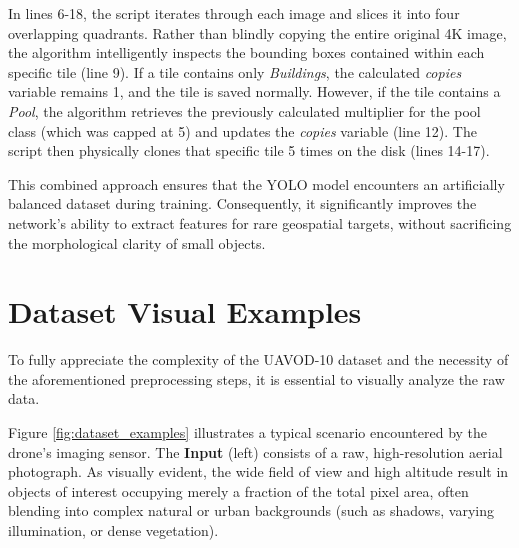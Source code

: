 In lines 6-18, the script iterates through each image and slices it into four overlapping quadrants. Rather than blindly copying the entire original 4K image, the algorithm intelligently inspects the bounding boxes contained within each specific tile (line 9). If a tile contains only \textit{Buildings}, the calculated \textit{copies} variable remains 1, and the tile is saved normally. However, if the tile contains a \textit{Pool}, the algorithm retrieves the previously calculated multiplier for the pool class (which was capped at 5) and updates the \textit{copies} variable (line 12). The script then physically clones that specific tile 5 times on the disk (lines 14-17).

This combined approach ensures that the YOLO model encounters an artificially balanced dataset during training. Consequently, it significantly improves the network's ability to extract features for rare geospatial targets, without sacrificing the morphological clarity of small objects.

\section{Dataset Visual Examples}
To fully appreciate the complexity of the UAVOD-10 dataset and the necessity of the aforementioned preprocessing steps, it is essential to visually analyze the raw data. 

Figure \ref{fig:dataset_examples} illustrates a typical scenario encountered by the drone's imaging sensor. The \textbf{Input} (left) consists of a raw, high-resolution aerial photograph. As visually evident, the wide field of view and high altitude result in objects of interest occupying merely a fraction of the total pixel area, often blending into complex natural or urban backgrounds (such as shadows, varying illumination, or dense vegetation). 

